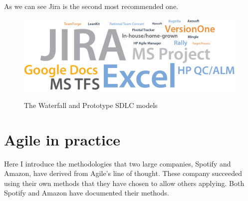 	As we can see Jira is the second most recommended one.

	\begin{figure}[H]
		\centering
		\includegraphics[width=.8\textwidth]{resources/Untitled_4}\\
		\caption{The Waterfall and Prototype SDLC models}
	\end{figure}

\section{Agile in practice}
	Here I introduce the methodologies that two large companies, Spotify and Amazon, have derived from Agile's line of thought.
	These company succeeded using their own methods that they have chosen to allow others applying.
	Both Spotify and Amazon have documented their methods.
